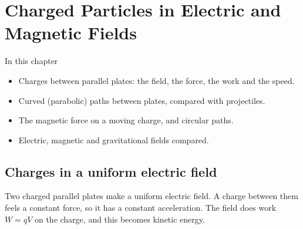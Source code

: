\chapter{Charged Particles in Electric and Magnetic Fields}\label{ch1:chap}

\begin{summarybox}{In this chapter}
\begin{itemize}
  \item Charges between parallel plates: the field, the force, the work and the speed.
  \item Curved (parabolic) paths between plates, compared with projectiles.
  \item The magnetic force on a moving charge, and circular paths.
  \item Electric, magnetic and gravitational fields compared.
\end{itemize}
\end{summarybox}

\section{Charges in a uniform electric field}\label{ch1:sec:efield}

\begin{bigidea}
Two charged parallel plates make a uniform electric field. A charge between
them feels a constant force, so it has a constant acceleration. The field does
work $W = qV$ on the charge, and this becomes kinetic energy.
\end{bigidea}

\begin{keywords}
\end{keywords}

